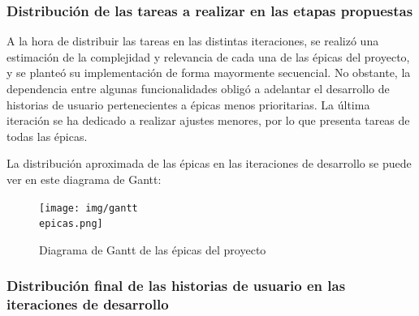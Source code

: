 \documentclass[10pt, a4paper]{aqademic}
\begin{document}
\subsubsection*{Distribución de las tareas a realizar en las etapas propuestas}

A la hora de distribuir las tareas en las distintas iteraciones, se realizó una estimación de la complejidad y relevancia de cada una de las épicas del proyecto, y se planteó su implementación de forma mayormente secuencial. No obstante, la dependencia entre algunas funcionalidades obligó a adelantar el desarrollo de historias de usuario pertenecientes a épicas menos prioritarias. La última iteración se ha dedicado a realizar ajustes menores, por lo que presenta tareas de todas las épicas.

La distribución aproximada de las épicas en las iteraciones de desarrollo se puede ver en este diagrama de Gantt:

\medskip

\begin{figure}[h]
	\centering
	\texttt{[image: img/gantt\\ epicas.png]}
	\caption{Diagrama de Gantt de las épicas del proyecto}
\end{figure}


\subsubsection*{Distribución final de las historias de usuario en las iteraciones de desarrollo}
\end{document}
